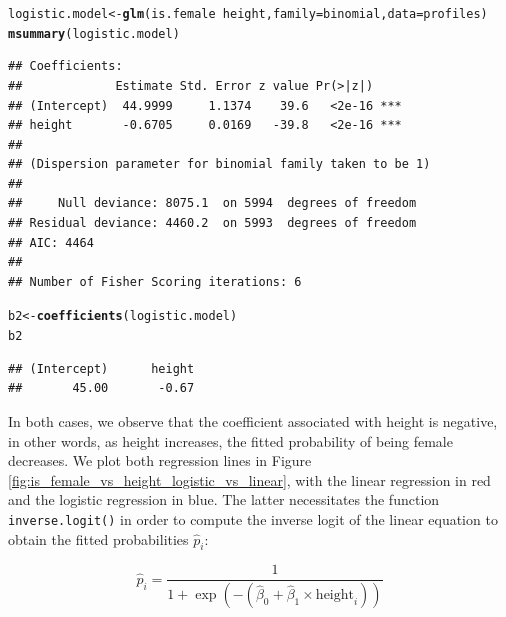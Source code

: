 \documentclass{article}\usepackage[]{graphicx}\usepackage[]{color}
\makeatletter
\newcommand{\hlopt}[1]{\textcolor[rgb]{0,0,0}{#1}}%
\newcommand{\hlstd}[1]{\textcolor[rgb]{0.345,0.345,0.345}{#1}}%
\newcommand{\hlkwb}[1]{\textcolor[rgb]{0.69,0.353,0.396}{#1}}%
\newcommand{\hlkwc}[1]{\textcolor[rgb]{0.333,0.667,0.333}{#1}}%
\newcommand{\hlkwd}[1]{\textcolor[rgb]{0.737,0.353,0.396}{\textbf{#1}}}%
\newenvironment{kframe}{%
 \def\at@end@of@kframe{}%
 \ifinner\ifhmode%
  \def\at@end@of@kframe{\end{minipage}}%
  \begin{minipage}{\columnwidth}%
 \fi\fi%
 \def\FrameCommand##1{\hskip\@totalleftmargin \hskip-\fboxsep
 \colorbox{shadecolor}{##1}\hskip-\fboxsep
     \hskip-\linewidth \hskip-\@totalleftmargin \hskip\columnwidth}%
 \MakeFramed {\advance\hsize-\width
   \@totalleftmargin\z@ \linewidth\hsize
   \@setminipage}}%
 {\par\unskip\endMakeFramed%
 \at@end@of@kframe}
\newenvironment{knitrout}{}{} %
\makeatother
\begin{document}
\begin{knitrout}
\color{fgcolor}\begin{kframe}
\begin{alltt}
\hlstd{logistic.model} \hlkwb{<-} \hlkwd{glm}\hlstd{(is.female} \hlopt{~} \hlstd{height,} \hlkwc{family}\hlstd{=binomial,} \hlkwc{data}\hlstd{=profiles)}
\hlkwd{msummary}\hlstd{(logistic.model)}
\end{alltt}
\begin{verbatim}
## Coefficients:
##             Estimate Std. Error z value Pr(>|z|)    
## (Intercept)  44.9999     1.1374    39.6   <2e-16 ***
## height       -0.6705     0.0169   -39.8   <2e-16 ***
## 
## (Dispersion parameter for binomial family taken to be 1)
## 
##     Null deviance: 8075.1  on 5994  degrees of freedom
## Residual deviance: 4460.2  on 5993  degrees of freedom
## AIC: 4464
## 
## Number of Fisher Scoring iterations: 6
\end{verbatim}
\begin{alltt}
\hlstd{b2} \hlkwb{<-} \hlkwd{coefficients}\hlstd{(logistic.model)}
\hlstd{b2}
\end{alltt}
\begin{verbatim}
## (Intercept)      height 
##       45.00       -0.67
\end{verbatim}
\end{kframe}
\end{knitrout}

In both cases, we observe that the coefficient associated with height is negative, in other words, as height increases, the fitted probability of being female decreases.  We plot both regression lines in Figure \ref{fig:is_female_vs_height_logistic_vs_linear}, with the linear regression in red and the logistic regression in blue.  The latter necessitates the function \verb#inverse.logit()# in order to compute the inverse logit of the linear equation to obtain the fitted probabilities $\widehat{p}_i$:

\[
\widehat{p}_i = \frac{1}{1+\exp\left(-(\widehat{\beta}_0 + \widehat{\beta}_1 \times \mbox{height}_i)\right)}
\]
\end{document}
